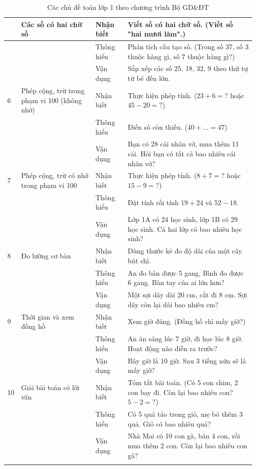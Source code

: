 \begin{longtable}{|>{\centering\arraybackslash}m{0.8cm}|m{3.5cm}|>{\centering\arraybackslash}m{2cm}|m{7.5cm}|}
	5 & Các số có hai chữ số
	& Nhận biết & Viết số có hai chữ số. (Viết số "hai mươi lăm".) \\
	\cline{3-4}
	& & Thông hiểu & Phân tích cấu tạo số. (Trong số 37, số 3 thuộc hàng gì, số 7 thuộc hàng gì?) \\
	\cline{3-4}
	& & Vận dụng & Sắp xếp các số 25, 18, 32, 9 theo thứ tự từ bé đến lớn. \\
	\hline

	6 & Phép cộng, trừ trong phạm vi 100 (không nhớ)
	& Nhận biết & Thực hiện phép tính. ($23+6=?$ hoặc $45-20=?$) \\
	\cline{3-4}
	& & Thông hiểu & Điền số còn thiếu. ($40 + \ldots = 47$) \\
	\cline{3-4}
	& & Vận dụng & Bạn có 28 cái nhãn vở, mua thêm 11 cái. Hỏi bạn có tất cả bao nhiêu cái nhãn vở? \\
	\hline

	7 & Phép cộng, trừ có nhớ trong phạm vi 100
	& Nhận biết & Thực hiện phép tính. ($8+7=?$ hoặc $15-9=?$) \\
	\cline{3-4}
	& & Thông hiểu & Đặt tính rồi tính $19+24$ và $52-18$. \\
	\cline{3-4}
	& & Vận dụng & Lớp 1A có 24 học sinh, lớp 1B có 29 học sinh. Cả hai lớp có bao nhiêu học sinh? \\
	\hline

	8 & Đo lường cơ bản
	& Nhận biết & Dùng thước kẻ đo độ dài của một cây bút chì. \\
	\cline{3-4}
	& & Thông hiểu & An đo bàn được 5 gang, Bình đo được 6 gang. Bàn tay của ai lớn hơn? \\
	\cline{3-4}
	& & Vận dụng & Một sợi dây dài 20 cm, cắt đi 8 cm. Sợi dây còn lại dài bao nhiêu cm? \\
	\hline

	9 & Thời gian và xem đồng hồ
	& Nhận biết & Xem giờ đúng. (Đồng hồ chỉ mấy giờ?) \\
	\cline{3-4}
	& & Thông hiểu & An ăn sáng lúc 7 giờ, đi học lúc 8 giờ. Hoạt động nào diễn ra trước? \\
	\cline{3-4}
	& & Vận dụng & Bây giờ là 10 giờ. Sau 3 tiếng nữa sẽ là mấy giờ? \\
	\hline

	10 & Giải bài toán có lời văn
	& Nhận biết & Tóm tắt bài toán. (Có 5 con chim, 2 con bay đi. Còn lại bao nhiêu con? $5-2=?$) \\
	\cline{3-4}
	& & Thông hiểu & Có 5 quả táo trong giỏ, mẹ bỏ thêm 3 quả. Giỏ có bao nhiêu quả? \\
	\cline{3-4}
	& & Vận dụng & Nhà Mai có 10 con gà, bán 4 con, rồi mua thêm 2 con. Còn lại bao nhiêu con gà? \\
	\hline

	\caption{Các chủ đề toán lớp 1 theo chương trình Bộ GD\&ĐT}
	\label{tab:toan-lop1}
\end{longtable}

